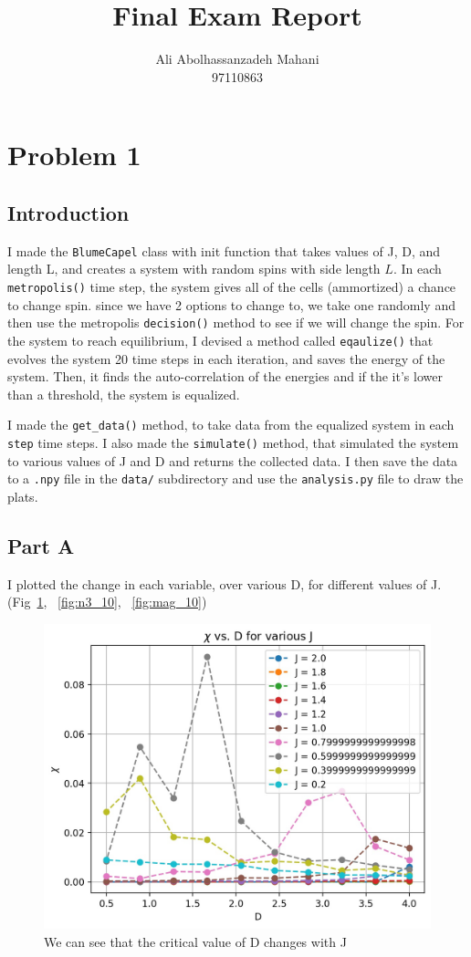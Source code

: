 \documentclass[12pt, a4paper]{article}
\title{Final Exam Report}
\author{Ali Abolhassanzadeh Mahani \\ 97110863}
\date{}
\begin{document}
	\maketitle
	\section{Problem 1}
	\subsection{Introduction}
	I made the \texttt{BlumeCapel} class with init function that takes values of J, D, and length L, and  creates a system with random spins with 
	side length $L$. In each \texttt{metropolis()} time step, the system gives all of the cells (ammortized) a chance to change spin. since we have
	2 options to change to, we take one randomly and then use the metropolis \texttt{decision()}  method to see if we will change the spin. For the 
	system to reach equilibrium, I devised a method called \texttt{eqaulize()} that evolves the system 20 time steps in each iteration, and saves
	the energy of the system. Then, it finds the auto-correlation of the energies and if the it's lower than a threshold, the system is equalized. 
	
	I made the \texttt{get\_data()} method, to take data from the equalized system in each \texttt{step} time steps. I also made the 
	\texttt{simulate()} method, that simulated the system to various values of J and D and returns the collected data. I then save the data to
	a \texttt{.npy} file in the \texttt{data/} subdirectory and use the \texttt{analysis.py} file to draw the plats.
	
	\subsection{Part A}
	I plotted the change in each variable, over various D, for different values of J. (Fig~\ref{fig:chi_10}, ~\ref{fig:n3_10}, ~\ref{fig:mag_10})
	
	\begin{figure}[h!]
		\centering
		\includegraphics[width=.8\linewidth]{../p1/results/chi_10.jpg}
		\caption{We can see that the critical value of D changes with J}
		\label{fig:chi_10}
	\end{figure}
\end{document}
